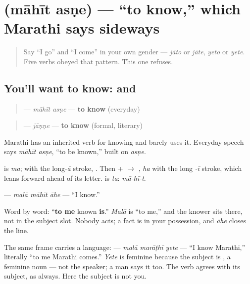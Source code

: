 \section[\texorpdfstring{\mr{माहीत} \mr{असणे} (māhīt asṇe)}{माहीत असणे (māhīt asṇe)}]{  (māhīt asṇe) — \textquotedblleft{}to know,\textquotedblright{} which Marathi says sideways}

\label{lesson:MR-C07-mahit-asne}



\begin{quote}
Say \textquotedblleft{}I go\textquotedblright{} and \textquotedblleft{}I come\textquotedblright{} in your own gender — \emph{jāto} or \emph{jāte}, \emph{yeto} or \emph{yete}. Five verbs obeyed that pattern. This one refuses.
\end{quote}

\subsection*{You'll want to know:   and }
\begin{quote}
\textbf{ } — \emph{māhīt asṇe} — \textbf{to know} (everyday)
\end{quote}

\begin{quote}
\textbf{} — \emph{jāṇṇe} — \textbf{to know} (formal, literary)
\end{quote}

Marathi has an inherited verb for knowing and barely uses it. Everyday speech says \emph{māhīt asṇe}, \textquotedblleft{}to be known,\textquotedblright{} built on \emph{asṇe}.

\begin{sounds}
\textbf{} is \emph{ma}; with the long-\emph{ā} stroke, \textbf{}. Then \textbf{} + \textbf{} $\to$ \textbf{}, \emph{ha} with the long \emph{-ī} stroke, which leans forward ahead of its letter. \textbf{} is \emph{ta}: \emph{mā-hī-t}.
\end{sounds}

\begin{grammarlens}[title={Grammar Lens: knowledge comes to you, you do not do it}]
\textbf{  } — \emph{malā māhīt āhe} — \textquotedblleft{}I know.\textquotedblright{}

Word by word: \textquotedblleft{}\textbf{to me} known \textbf{is}.\textquotedblright{} \emph{Malā} is \textquotedblleft{}to me,\textquotedblright{} and the knower sits there, not in the subject slot. Nobody acts; a fact is in your possession, and \emph{āhe} closes the line.

The same frame carries a language: \textbf{  } — \emph{malā marāṭhī yete} — \textquotedblleft{}I know Marathi,\textquotedblright{} literally \textquotedblleft{}to me Marathi comes.\textquotedblright{} \emph{Yete} is feminine because the subject is \textbf{}, a feminine noun — not the speaker; a man says it too. The verb agrees with its subject, as always. Here the subject is not you.
\end{grammarlens}

